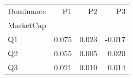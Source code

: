 \begin{tabular}{lrrr}
\toprule
Dominance & P1 & P2 & P3 \\
MarketCap &  &  &  \\
\midrule
Q1 & 0.075 & 0.023 & -0.017 \\
Q2 & 0.055 & 0.005 & 0.020 \\
Q3 & 0.021 & 0.010 & 0.014 \\
\bottomrule
\end{tabular}

